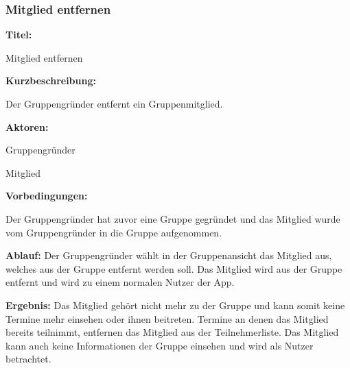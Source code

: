 \documentclass{scrartcl}
\begin{document}
	\subsubsection{Mitglied entfernen}
	\begin{description}
		\item \textbf{Titel:}
		\begin{description}
			\item Mitglied entfernen
		\end{description}
		\item \textbf{Kurzbeschreibung:}
		\begin{description}
			\item Der Gruppengründer entfernt ein Gruppenmitglied.
		\end{description}
		\item \textbf{Aktoren:}
		\begin{description}
			\item Gruppengründer
			\item Mitglied
		\end{description}
		\item \textbf{Vorbedingungen:}
		\begin{description}
			\item Der Gruppengründer hat zuvor eine Gruppe gegründet und das Mitglied wurde vom Gruppengründer in die Gruppe aufgenommen.
		\end{description}
		\item \textbf{Ablauf:} \newline Der Gruppengründer wählt in der Gruppenansicht das Mitglied aus, welches aus der Gruppe entfernt werden soll. Das Mitglied wird aus der Gruppe entfernt und wird zu einem normalen Nutzer der App.
		\item \textbf{Ergebnis:} \newline Das Mitglied gehört nicht mehr zu der Gruppe und kann somit keine Termine mehr einsehen oder ihnen beitreten. Termine an denen das Mitglied bereits teilnimmt, entfernen das Mitglied aus der Teilnehmerliste. Das Mitglied kann auch keine Informationen der Gruppe einsehen und wird als Nutzer betrachtet.
	\end{description}
	
	\newpage
	
\end{document}
